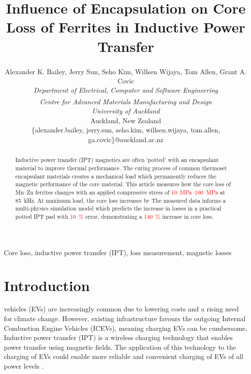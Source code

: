 \documentclass[conference]{IEEEtran}
\begin{document}
\title{Influence of Encapsulation on Core Loss of Ferrites in Inductive Power Transfer}

\author{
  Alexander K. Bailey, Jerry Sun\textsuperscript{\textdagger}, Seho Kim, Willsen Wijaya\textsuperscript{\textdagger}, Tom Allen\textsuperscript{\textdagger}, Grant A. Covic\\
  \textit{Department of Electrical, Computer and Software Engineering}\\
  \textit{\textsuperscript{\textdagger}Centre for Advanced Materials Manufacturing and Design}\\
  \textit{University of Auckland}\\
  Auckland, New Zealand\\
  \{alexander.bailey, jerry.sun, seho.kim, willsen.wijaya, tom.allen, ga.covic\}@auckland.ac.nz\\ 
}
\maketitle
\thispagestyle{plain}
\pagestyle{plain}

\begin{abstract}
  Inductive power transfer (IPT) magnetics are often `potted' with an encapsulant material to improve thermal performance.
  The curing process of common thermoset encapsulant materials creates a mechanical load which permanently reduces the magnetic performance of the core material. 
  This article measures how the core loss of Mn--Zn ferrites changes with an applied compressive stress of \textcolor{red}{\SIrange{10}{100}{\mega\pascal}} at \SI{85}{\kilo\hertz}. 
  At maximum load, the core loss increases by 
  The measured data informs a multi-physics simulation model which predicts the increase in losses in a practical potted IPT pad with \textcolor{red}{\SI{10}{\percent}} error, demonstrating a \textcolor{red}{\SI{140}{\percent}} increase in core loss. 
\end{abstract}

\begin{IEEEkeywords}
Core loss, inductive power transfer (IPT), loss measurement, magnetic losses
\end{IEEEkeywords}

\section{Introduction}
 vehicles (EVs) are increasingly common due to lowering costs and a rising need for climate change. 
However, existing infrastructure favours the outgoing Internal Combustion Engine Vehicles (ICEVs), meaning charging EVs can be cumbersome. 
Inductive power transfer (IPT) is a wireless charging technology that enables power transfer using magnetic fields. 
The application of this technology to the charging of EVs could enable more reliable and convenient charging of EVs of all power levels \cite{covicModernTrendsInductive2013b}. 
\end{document}
